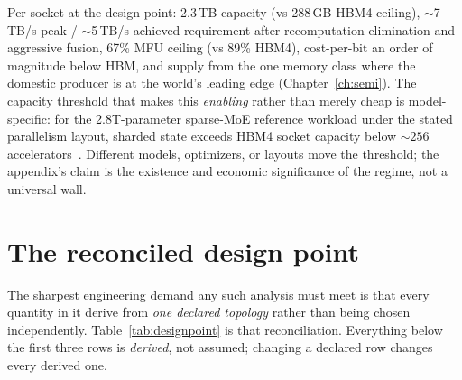 Per socket at the design point: 2.3\,TB capacity (vs 288\,GB HBM4 ceiling), $\sim$7\,TB/s peak / $\sim$5\,TB/s achieved requirement after recomputation elimination and aggressive fusion, 67\% MFU ceiling (vs 89\% HBM4), cost-per-bit an order of magnitude below HBM, and supply from the one memory class where the domestic producer is at the world's leading edge (Chapter~\ref{ch:semi}). The capacity threshold that makes this \emph{enabling} rather than merely cheap is model-specific: for the 2.8T-parameter sparse-MoE reference workload under the stated parallelism layout, sharded state exceeds HBM4 socket capacity below ${\sim}256$ accelerators~\cite{riken-study}. Different models, optimizers, or layouts move the threshold; the appendix's claim is the existence and economic significance of the regime, not a universal wall.

\section{The reconciled design point}
\label{sec:designpoint}

The sharpest engineering demand any such analysis must meet is that every quantity in it derive from \emph{one declared topology} rather than being chosen independently. Table~\ref{tab:designpoint} is that reconciliation. Everything below the first three rows is \emph{derived}, not assumed; changing a declared row changes every derived one.


